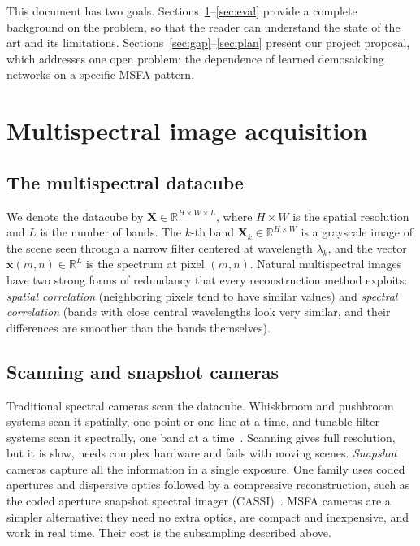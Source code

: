 \documentclass{article}
\def\X{{\mathbf X}}
\def\x{{\mathbf x}}
\begin{document}
This document has two goals. Sections~\ref{sec:msi}--\ref{sec:eval} provide
a complete background on the problem, so that the reader can understand the
state of the art and its limitations. Sections~\ref{sec:gap}--\ref{sec:plan}
present our project proposal, which addresses one open problem: the
dependence of learned demosaicking networks on a specific MSFA pattern.

\section{Multispectral image acquisition}
\label{sec:msi}

\subsection{The multispectral datacube}

We denote the datacube by $\X\in\mathbb{R}^{H\times W\times L}$, where
$H\times W$ is the spatial resolution and $L$ is the number of bands. The
$k$-th band $\X_k\in\mathbb{R}^{H\times W}$ is a grayscale image of the scene
seen through a narrow filter centered at wavelength $\lambda_k$, and the
vector $\x(m,n)\in\mathbb{R}^L$ is the spectrum at pixel $(m,n)$. Natural
multispectral images have two strong forms of redundancy that every
reconstruction method exploits: \emph{spatial correlation} (neighboring pixels
tend to have similar values) and \emph{spectral correlation} (bands with close
central wavelengths look very similar, and their differences are smoother than
the bands themselves).

\subsection{Scanning and snapshot cameras}

Traditional spectral cameras scan the datacube. Whiskbroom and pushbroom
systems scan it spatially, one point or one line at a time, and tunable-filter
systems scan it spectrally, one band at a time~\cite{lapray2014}. Scanning
gives full resolution, but it is slow, needs complex hardware and fails with
moving scenes. \emph{Snapshot} cameras capture all the information in a single
exposure. One family uses coded apertures and dispersive optics followed by
a compressive reconstruction, such as the coded aperture snapshot spectral
imager (CASSI)~\cite{arce2014}. MSFA cameras are a simpler alternative: they
need no extra optics, are compact and inexpensive, and work in real time.
Their cost is the subsampling described above.
\end{document}
